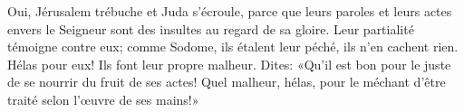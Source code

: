 Oui, Jérusalem trébuche et Juda s’écroule,
	parce que leurs paroles et leurs actes envers le Seigneur
		sont des insultes au regard de sa gloire.
Leur partialité témoigne contre eux;
	comme Sodome, ils étalent leur péché, ils n’en cachent rien.
	Hélas pour eux! Ils font leur propre malheur.
Dites: «Qu’il est bon pour le juste de se nourrir du fruit de ses actes!
	Quel malheur, hélas, pour le méchant d’être traité selon l’œuvre de ses mains!»

